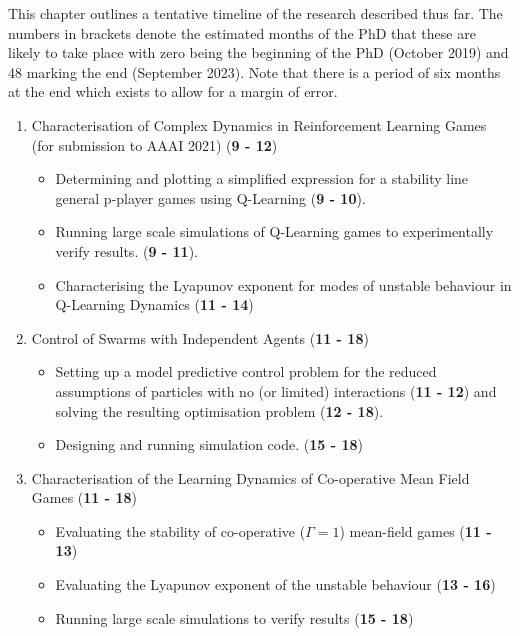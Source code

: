 \documentclass[.../main.tex]{subfiles}
\begin{document}
    
	This chapter outlines a tentative timeline of the research
        described thus far. The numbers in brackets denote the
        estimated months of the PhD that these are likely to take
        place with zero being the beginning of the PhD (October 2019)
        and 48 marking the end (September 2023). Note that there is a
        period of six months at the end which exists to allow for a
        margin of error.


	\begin{enumerate}
		\item Characterisation of Complex Dynamics in Reinforcement Learning Games (for submission
		to AAAI 2021) (\textbf{9 - 12})
		\begin{itemize}
			\item Determining and plotting a simplified expression for a stability line general
			p-player games using Q-Learning (\textbf{9 - 10}).
			\item Running large scale simulations of Q-Learning games to experimentally verify
			results. (\textbf{9 - 11}).
			\item Characterising the Lyapunov exponent for modes of unstable behaviour in Q-Learning
			Dynamics (\textbf{11 - 14})
		\end{itemize}

		\item Control of Swarms with Independent Agents (\textbf{11 - 18})
		\begin{itemize}
			\item Setting up a model predictive control problem for the reduced assumptions of
			particles with no (or limited) interactions (\textbf{11 - 12}) and solving the resulting
			optimisation problem (\textbf{12 - 18}). 
			\item Designing and running simulation code. (\textbf{15 - 18})
		\end{itemize}

		\item Characterisation of the Learning Dynamics of Co-operative Mean Field Games (\textbf{11
				- 18})
		\begin{itemize}
			\item Evaluating the stability of co-operative ($\Gamma = 1$) mean-field games (\textbf{11 - 13})
			\item Evaluating the Lyapunov exponent of the unstable behaviour (\textbf{13 - 16})
			\item Running large scale simulations to verify results (\textbf{15 - 18})
		\end{itemize}


\end{enumerate}
\end{document}
